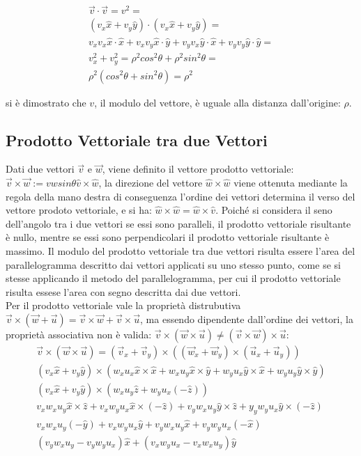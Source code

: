 \documentclass{article}
\numberwithin{equation}{subsection}
\begin{document}
\begin{gather}
    \vec{v}\cdot\vec{v} = v^{2} =\\
    (v_x\hat{x} + v_y\hat{y})\cdot(v_x\hat{x} + v_y\hat{y}) =\\
    v_xv_x \hat{x}\cdot\hat{x} + v_xv_y\hat{x}\cdot\hat{y} + v_yv_x\hat{y}\cdot\hat{x} + v_yv_y\hat{y}\cdot\hat{y}=\\
    v_x^{2} + v_y^{2} = \rho^{2}cos^{2}\theta + \rho^2sin^{2}\theta =\\
    \rho^{2}(cos^{2}\theta + sin^{2}\theta) = \rho^{2}
\end{gather} 

si è dimostrato che $v$, il modulo del vettore, è uguale alla distanza dall'origine: $\rho$.

\subsection{Prodotto Vettoriale tra due Vettori}
Dati due vettori $\vec{v}$ e $\vec{w}$, viene definito il vettore prodotto vettoriale: $\vec{v}\times\vec{w} := vwsin\theta \hat{v}\times\hat{w}$, 
la direzione del vettore $\hat{w}\times\hat{w}$ viene ottenuta mediante la regola della mano destra
di conseguenza l'ordine dei vettori determina il verso del vettore prodoto vettoriale, e si ha: $\hat{w}\times\hat{w} = \hat{w}\times\hat{v}$.
Poiché si considera il seno dell'angolo tra i due vettori se essi sono paralleli, il prodotto vettoriale risultante è nullo, mentre se essi 
sono perpendicolari il prodotto vettoriale risultante è massimo. Il modulo del prodotto vettoriale tra due vettori risulta essere l'area del 
parallelogramma descritto dai vettori applicati su uno stesso punto, come se si stesse applicando il metodo del parallelogramma, per cui 
il prodotto vettoriale risulta essese l'area con segno descritta dai due vettori. \\
Per il prodotto vettoriale vale la proprietà distrubutiva 
$\vec{v}\times(\vec{w} +\vec{u}) = \vec{v}\times\vec{w} + \vec{v}\times\vec{u}$, 
ma essendo 
dipendente dall'ordine dei vettori, la proprietà associativa 
non è valida: 
$\vec{v}\times(\vec{w}\times\vec{u}) \neq (\vec{v}\times\vec{w})\times\vec{u}$:
\begin{gather}
    \vec{v}\times(\vec{w}\times\vec{u})=(\vec{v}_x+\vec{v}_y)\times((\vec{w}_x+\vec{w}_y)\times(\vec{u}_x+\vec{u}_y))\\
    (v_x\hat{x}+v_y\hat{y})\times(w_xu_x\hat{x}\times\hat{x}+w_xu_y\hat{x}\times\hat{y}+w_yu_x\hat{y}\times\hat{x}+w_yu_y\hat{y}\times\hat{y})\\
    (v_x\hat{x}+v_y\hat{y})\times(w_xu_y\hat{z}+w_yu_x(-\hat{z}))\\
    v_xw_xu_y\hat{x}\times\hat{z}+v_xw_yu_x\hat{x}\times(-\hat{z})+v_yw_xu_y\hat{y}\times\hat{z}+y_yw_yu_x\hat{y}\times(-\hat{z})\\
    v_xw_xu_y(-\hat{y})+v_xw_yu_x\hat{y}+v_yw_xu_y\hat{x}+v_yw_yu_x(-\hat{x})\\
    (v_yw_xu_y-v_yw_yu_x)\hat{x}+(v_xw_yu_x-v_xw_xu_y)\hat{y}
\end{gather}
\end{document}
